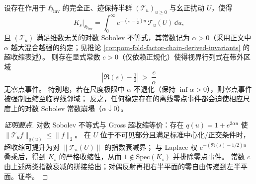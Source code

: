 \begin{proposition}\label{prop:op-algebra-logsobolev-zero-band}
设存在作用于 \(\mathfrak{H}_{\mathrm{inv}}\) 的完全正、迹保持半群 \((\mathcal{T}_u)_{u\ge 0}\) 与幺正扰动 \(U\)，使得
\[
K_s\big|_{\mathfrak{H}_{\mathrm{inv}}}
=\int_{0}^{\infty}e^{-(s-\tfrac12)u}\,\mathcal{T}_u(U)\,\dd u,
\]
且 \((\mathcal{T}_u)\) 满足维数无关的对数 Sobolev 不等式，其常数记为 \(\alpha>0\)（采用正文中 \(\alpha\) 越大混合越强的约定；见推论 \ref{cor:pom-fold-factor-chain-derived-invariants} 的超收缩表述）。
则存在显式常数 \(c>0\)（仅依赖正规化）使得视界行列式在带外区域
\[
|\Re(s)-\tfrac12|\ >\ \frac{c}{\alpha}
\]
无零点事件。
特别地，若在尺度极限中 \(\alpha\) 不退化（保持 \(\inf \alpha>0\)），则零点事件被强制压缩至临界线邻域；
反之，任何稳定存在的离线零点事件都会迫使相应尺度上的对数 Sobolev 常数崩塌（\(\alpha\downarrow 0\)）。
\end{proposition}
\begin{proof}[证明要点]
对数 Sobolev 不等式与 Gross 超收缩等价：存在 \(q(u)=1+e^{2\alpha u}\) 使 \(\|\mathcal{T}_u f\|_{q(u)}\le \|f\|_2\)。
在 \(U\) 位于不可见部分且满足标准中心化/正交条件时，超收缩可提升为对 \(\|\mathcal{T}_u(U)\|\) 的指数衰减界；
与 Laplace 权 \(e^{-(\Re(s)-1/2)u}\) 叠乘后，得到 \(K_s\) 的严格收缩性，从而 \(1\notin\mathrm{Spec}(K_s)\) 并排除零点事件。
常数 \(c\) 由上述两类指数衰减的拼接给出；对偶反射再把右半平面的零自由传递到左半平面。证毕。
\end{proof}

\endinput

